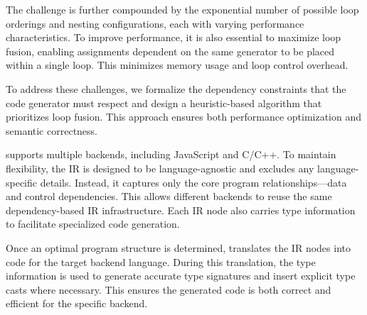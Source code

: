 \documentclass[acmsmall,nonacm]{acmart}\settopmatter{printfolios=true,printccs=false,printacmref=false}
\newcommand{\rhyme}{\text{Rhyme}\xspace}
\begin{document}
The challenge is further compounded by the exponential number of possible loop orderings and nesting configurations, each with varying performance characteristics. To improve performance, it is also essential to maximize loop fusion, enabling assignments dependent on the same generator to be placed within a single loop. This minimizes memory usage and loop control overhead.

To address these challenges, we formalize the dependency constraints that the code generator must respect and design a heuristic-based algorithm that prioritizes loop fusion. This approach ensures both performance optimization and semantic correctness.

\rhyme supports multiple backends, including JavaScript and C/C++. To maintain flexibility, the IR is designed to be language-agnostic and excludes any language-specific details. Instead, it captures only the core program relationships—data and control dependencies. This allows different backends to reuse the same dependency-based IR infrastructure. Each IR node also carries type information to facilitate specialized code generation.

Once an optimal program structure is determined, \rhyme translates the IR nodes into code for the target backend language. During this translation, the type information is used to generate accurate type signatures and insert explicit type casts where necessary. This ensures the generated code is both correct and efficient for the specific backend.\par
\end{document}
